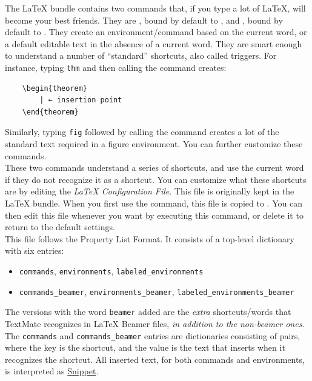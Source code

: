 \documentclass[11pt, x11names]{article}
\begin{document}
The LaTeX bundle contains two commands that, if you type a lot of LaTeX, will become your best friends. They are , bound by default to \keys{\cmd + \textless{}}, and , bound by default to \keys{\cmd + \textgreater{}}. They create an environment/command based on the current word, or a default editable text in the absence of a current word. They are smart enough to understand a number of “standard” shortcuts, also called triggers. For instance, typing \texttt{thm} and then calling the  command creates:

\begin{verbatim}
    \begin{theorem}
        | ← insertion point
    \end{theorem}
\end{verbatim}

Similarly, typing \texttt{fig} followed by calling the  command creates a lot of the standard text required in a figure environment. You can further customize these commands.\\

These two commands understand a series of shortcuts, and use the current word if they do not recognize it as a shortcut. You can customize what these shortcuts are by editing the \emph{LaTeX Configuration File}. This file is originally kept in the LaTeX bundle. When you first use the  command, this file is copied to . You can then edit this file whenever you want by executing this command, or delete it to return to the default settings.\\

This file follows the Property List Format. It consists of a top-level dictionary
with six entries:

\begin{itemize}
    \item \texttt{commands}, \texttt{environments}, \texttt{labeled\_environments}
    \item \texttt{commands\_beamer}, \texttt{environments\_beamer}, \texttt{labeled\_environments\_beamer}
\end{itemize}

\begin{sloppypar}
The versions with the word \texttt{beamer} added are the \emph{extra} shortcuts/words that TextMate recognizes in LaTeX Beamer files, \emph{in addition to the non-beamer ones}. The \texttt{commands} and \texttt{commands\_beamer} entries are dictionaries consisting of pairs, where the key is the shortcut, and the value is the text that  inserts when it recognizes the shortcut. All inserted text, for both commands and environments, is interpreted as \href{http://manual.textmate.org/snippets.html#snippets}{Snippet}.\\
\end{sloppypar}
\end{document}
